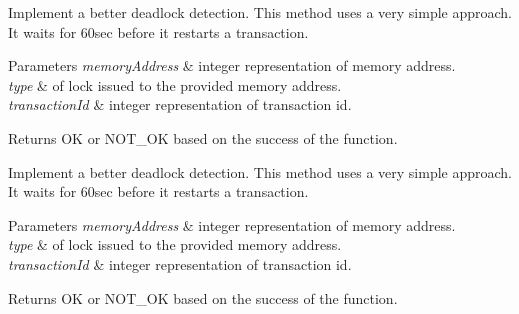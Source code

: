 
\begin{DoxyRefList}
\item[\label{todo__todo000004}%
\hypertarget{todo__todo000004}{}%
Member \hyperlink{transaction_8h_a32d2de9c87a4523887516bba8308ab34}{A\+K\+\_\+acquire\+\_\+lock} (int, int, pthread\+\_\+t)]Implement a better deadlock detection. This method uses a very simple approach. It waits for 60sec before it restarts a transaction. 
\begin{DoxyParams}{Parameters}
{\em memory\+Address} & integer representation of memory address. \\
\hline
{\em type} & of lock issued to the provided memory address. \\
\hline
{\em transaction\+Id} & integer representation of transaction id. \\
\hline
\end{DoxyParams}
\begin{DoxyReturn}{Returns}
O\+K or N\+O\+T\+\_\+\+O\+K based on the success of the function.  
\end{DoxyReturn}

\item[\label{todo__todo000004}%
\hypertarget{todo__todo000004}{}%
Member \hyperlink{transaction_8h_a32d2de9c87a4523887516bba8308ab34}{A\+K\+\_\+acquire\+\_\+lock} (int, int, pthread\+\_\+t)]Implement a better deadlock detection. This method uses a very simple approach. It waits for 60sec before it restarts a transaction. 
\begin{DoxyParams}{Parameters}
{\em memory\+Address} & integer representation of memory address. \\
\hline
{\em type} & of lock issued to the provided memory address. \\
\hline
{\em transaction\+Id} & integer representation of transaction id. \\
\hline
\end{DoxyParams}
\begin{DoxyReturn}{Returns}
O\+K or N\+O\+T\+\_\+\+O\+K based on the success of the function.  
\end{DoxyReturn}


\end{DoxyRefList}
